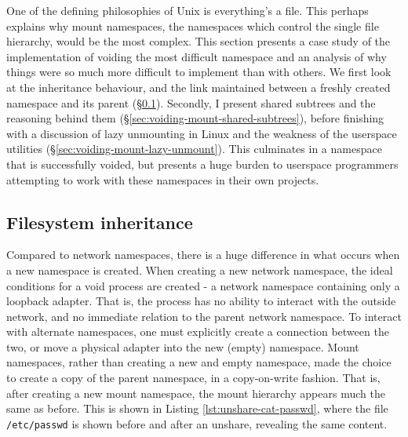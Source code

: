 \documentclass[12pt,a4paper,twoside]{report}
\begin{document}
One of the defining philosophies of Unix is everything's a file. This perhaps explains why mount namespaces, the namespaces which control the single file hierarchy, would be the most complex. This section presents a case study of the implementation of voiding the most difficult namespace and an analysis of why things were so much more difficult to implement than with others. We first look at the inheritance behaviour, and the link maintained between a freshly created namespace and its parent (§\ref{sec:voiding-mount-inherited}). Secondly, I present shared subtrees and the reasoning behind them (§\ref{sec:voiding-mount-shared-subtrees}), before finishing with a discussion of lazy unmounting in Linux and the weakness of the userspace utilities (§\ref{sec:voiding-mount-lazy-unmount}). This culminates in a namespace that is successfully voided, but presents a huge burden to userspace programmers attempting to work with these namespaces in their own projects.

\subsection{Filesystem inheritance}
\label{sec:voiding-mount-inherited}

Compared to network namespaces, there is a huge difference in what occurs when a new namespace is created. When creating a new network namespace, the ideal conditions for a void process are created - a network namespace containing only a loopback adapter. That is, the process has no ability to interact with the outside network, and no immediate relation to the parent network namespace. To interact with alternate namespaces, one must explicitly create a connection between the two, or move a physical adapter into the new (empty) namespace. Mount namespaces, rather than creating a new and empty namespace, made the choice to create a copy of the parent namespace, in a copy-on-write fashion. That is, after creating a new mount namespace, the mount hierarchy appears much the same as before. This is shown in Listing \ref{lst:unshare-cat-passwd}, where the file \texttt{/etc/passwd} is shown before and after an unshare, revealing the same content.
\end{document}
